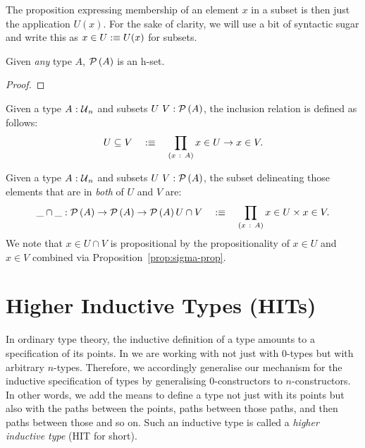 The proposition expressing membership of an element $x$ in a subset is then just the
application $U(x)$. For the sake of clarity, we will use a bit of syntactic sugar and
write this as $x \in U :\equiv U(x)$ for subsets.

\begin{prop}\label{prop:pow-set}
  Given \emph{any} type $A$, $\mathcal{P}\left(A\right)$ is an h-set.
\end{prop}
\begin{proof}
\end{proof}

\begin{defn}\label{defn:inclusion}
  Given a type $A\hspace{0.1mm}:\hspace{0.1mm}\mathcal{U}{}_n$ and subsets $U~V:\mathcal{P}\left(A\right)$, the inclusion
  relation is defined as follows:
  \begin{equation*}
    U \subseteq V \quad:\equiv\quad \prod_{(x~:~A)} x \in U \rightarrow x \in V.
  \end{equation*}
\end{defn}

\begin{defn}\label{defn:intersection}
  Given a type $A\hspace{0.1mm}:\hspace{0.1mm}\mathcal{U}{}_n$ and subsets $U~V:\mathcal{P}\left(A\right)$, the subset
  delineating those elements that are in \emph{both} of $U$ and $V$ are:
  \begin{equation*}
    \_\cap\_ : \mathcal{P}\left(A\right) \rightarrow \mathcal{P}\left(A\right) \rightarrow \mathcal{P}\left(A\right)
    U \cap V \quad:\equiv\quad \prod_{(x~:~A)} x \in U \times x \in V.
  \end{equation*}
  We note that $x \in U \cap V$ is propositional by the propositionality of $x \in U$ and $x \in V$
  combined via Proposition~\ref{prop:sigma-prop}.
\end{defn}


\section{Higher Inductive Types (HITs)}

In ordinary type theory, the inductive definition of a type amounts to a specification of
its points. In \UF{} we are working with not just with $0$-types but with arbitrary
$n$-types. Therefore, we accordingly generalise our mechanism for the inductive
specification of types by generalising $0$-constructors to $n$-constructors. In other
words, we add the means to define a type not just with its points but also with the paths
between the points, paths between those paths, and then paths between those and so on.
Such an inductive type is called a \emph{higher inductive type} (HIT for short).

